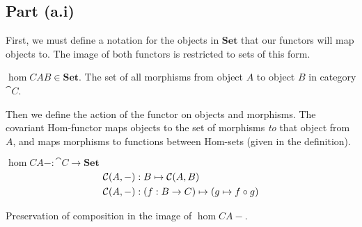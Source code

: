 \subsection{Part (a.i)}\label{sec:q-1-a-i}

First, we must define a notation for the objects in $\mathbf{Set}$ that our functors will map objects to. The image of both functors is restricted to sets of this form.

\begin{definition}\label{def:hom-set}
  $\hom{C}{A}{B}\in\mathbf{Set}$. The set of all morphisms from object $A$ to object $B$ in category $\cat{C}$.
\end{definition}

Then we define the action of the functor on objects and morphisms. The covariant Hom-functor maps objects to the set of morphisms \textit{to} that object from $A$, and maps morphisms to functions between Hom-sets (given in the definition).

\begin{definition}\label{def:co-hom}
  $\hom{C}{A}{-} : \cat{C} \to \mathbf{Set}$
  \begin{align*}
    \mathcal{C}(A, -) & : B \mapsto \mathcal{C}(A, B)\\
    \mathcal{C}(A, -) & : (f : B \to C) \mapsto (g \mapsto f \circ g)
  \end{align*}
\end{definition}

\begin{marginfigure}[10em]
  \caption{Preservation of composition in the image of $\hom{C}{A}{-}$.}\label{fig:co-functor}
\end{marginfigure}

